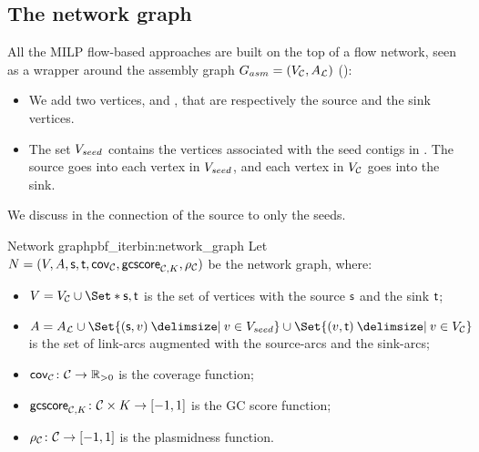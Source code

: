 \subsection{The network graph}\label{sec:pbf_iterbin:network}

All the MILP flow-based approaches are built on the top of a flow network, seen as a wrapper around the assembly graph \(G_{asm} = (V_{\mathcal{C}}{}, A_{\mathcal{L}})\) ():

\begin{itemize}
  \item We add two vertices, \source{} and \sink{}, that are respectively the source and the sink vertices.
  \item The set \(V_{seed}{}\) contains the vertices associated with the seed contigs in \ContigSeeds{}.
    The source goes into each vertex in \(V_{seed}{}\), and each vertex in \(V_{\mathcal{C}{}}\) goes into the sink.
\end{itemize}

\begin{notebox}
  We discuss in  the connection of the source to only the seeds.
\end{notebox}

\begin{definition}{Network graph}{pbf_iterbin:network_graph}
  Let \(N = (V, A, \mathsf{s}{}, \mathsf{t}{}, \mathsf{cov}_{\mathcal{C}{}}, \mathsf{gcscore}_{\mathcal{C}{}, K}, \rho_{\mathcal{C}{}})\) be the network graph, where:

  \begin{itemize}
    \item \( V = V_\Contigs{} \cup \Set*{\source{}, \sink{}} \) is the set of vertices with the source \(\mathsf{s}{}\) and the sink \(\mathsf{t}{}\);
    \item \( A = A_\Links{} \cup \Set{(\source, v) \given v \in \VSeeds{}} \cup \Set{(v, \sink) \given v \in V_\Contigs{}} \) is the set of link-arcs augmented with the source-arcs and the sink-arcs;
    \item \( \mathsf{cov}_{\mathcal{C}{}} \colon \mathcal{C}{} \to \mathbb{R}{}_{> 0} \) is the coverage function;
    \item \( \mathsf{gcscore}_{\mathcal{C}{}, K} \colon \mathcal{C}{} \times K \to [-1, 1] \) is the GC score function;
    \item \( \rho_{\mathcal{C}{}} \colon \mathcal{C}{} \to [-1, 1] \) is the plasmidness function.
  \end{itemize}
\end{definition}
